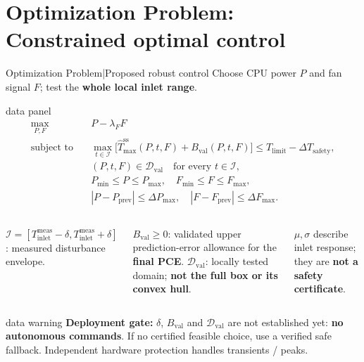 \section{Optimization Problem: Constrained optimal control}

\begin{frame}{Optimization Problem\enspace|\enspace Proposed robust control}
  {\footnotesize Choose CPU power $P$ and fan signal $F$; test the \textbf{whole local inlet range}.}
  \smallskip
  \begin{beamercolorbox}[sep=1.5mm,wd=\textwidth]{data panel}
    \small
    \setlength{\abovedisplayskip}{3pt}
    \setlength{\belowdisplayskip}{3pt}
    \[
      \begin{aligned}
        \max_{P,F}\quad &
          P-\lambda_F F\\[1mm]
        \text{subject to}\quad
        &\max_{t\in\mathcal I}\bigl[\widehat T_{\max}^{\mathrm{ss}}(P,t,F)
          +B_{\mathrm{val}}(P,t,F)\bigr]
          \leq T_{\mathrm{limit}}-\Delta T_{\mathrm{safety}},\\[1mm]
        &(P,t,F)\in\mathcal D_{\mathrm{val}}\quad\text{for every }t\in\mathcal I,\\[1mm]
        &P_{\min}\leq P\leq P_{\max},\quad
          F_{\min}\leq F\leq F_{\max},\\[1mm]
        &|P-P_{\mathrm{prev}}|\leq\Delta P_{\max},\quad
          |F-F_{\mathrm{prev}}|\leq\Delta F_{\max}.
      \end{aligned}
    \]
  \end{beamercolorbox}
  \smallskip
  \begin{columns}[T,onlytextwidth]
      \footnotesize
      $\mathcal I=[T_{\mathrm{inlet}}^{\mathrm{meas}}-\delta,
      T_{\mathrm{inlet}}^{\mathrm{meas}}+\delta]$: measured disturbance envelope.\par
      $B_{\mathrm{val}}\geq0$: validated upper prediction-error allowance for the \textbf{final PCE}.
      \footnotesize
      $\mathcal D_{\mathrm{val}}$: locally tested domain; \textbf{not the full box or its convex hull}.\par
      $\mu,\sigma$ describe inlet response; they are \textbf{not a safety certificate}.
  \end{columns}
  \smallskip
  \begin{beamercolorbox}[sep=1mm,wd=\textwidth]{data warning}
    \footnotesize \textbf{Deployment gate:} $\delta$, $B_{\mathrm{val}}$ and $\mathcal D_{\mathrm{val}}$ are not established yet:
    \textbf{no autonomous commands}. If no certified feasible choice, use a verified safe fallback.
    Independent hardware protection handles transients / peaks.
  \end{beamercolorbox}
\end{frame}
